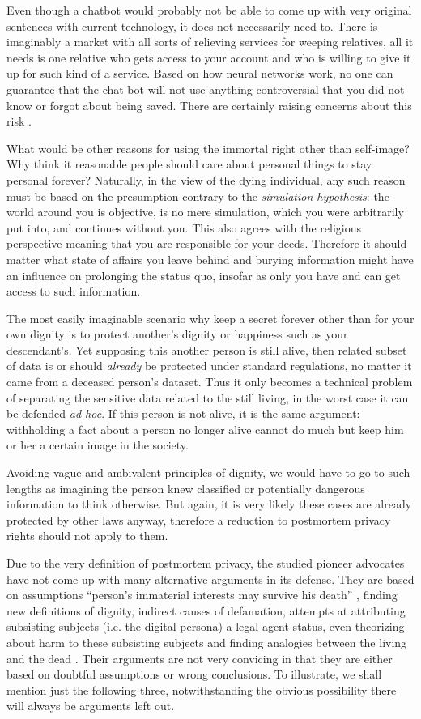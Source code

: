 \documentclass[a4paper]{article}
\begin{document}
Even though a chatbot would probably not be able to come up with very original sentences with current technology, it does not necessarily need to. 
There is imaginably a market with all sorts of relieving services for weeping relatives, all it needs is one relative who gets access to your account and who is willing to give it up for such kind of a service. 
Based on how neural networks work, no one can guarantee that the chat bot will not use anything controversial that you did not know or forgot about being saved. There are certainly raising concerns about this risk \cite{angstrom}.

What would be other reasons for using the immortal right other than self-image? Why think it reasonable people should care about personal things to stay personal forever? Naturally, in the view of the dying individual, any such reason must be based on the presumption contrary to the \textit{simulation hypothesis}: \cite{bostrom} the world around you is objective, is no mere simulation, which you were arbitrarily put into, and continues without you. This also agrees with the religious perspective meaning that you are responsible for your deeds.
Therefore it should matter what state of affairs you leave behind and burying information might have an influence on prolonging the status quo, insofar as only you have and can get access to such information.

The most easily imaginable scenario why keep a secret forever other than for your own dignity is to protect another's dignity or happiness such as your descendant's. Yet supposing this another person is still alive, then related subset of data is or should \emph{already} be protected under standard regulations, no matter it came from a deceased person's dataset. Thus it only becomes a technical problem of separating the sensitive data related to the still living, in the worst case it can be defended \emph{ad hoc}. If this person is not alive, it is the same argument: withholding a fact about a person no longer alive cannot do much but keep him or her a certain image in the society.

Avoiding vague and ambivalent principles of dignity, we would have to go to such lengths as imagining the person knew classified or potentially dangerous information to think otherwise. But again, it is very likely these cases are already protected by other laws anyway, therefore a reduction to postmortem privacy rights should not apply to them.

Due to the very definition of postmortem privacy, the studied pioneer advocates have not come up with many alternative arguments in its defense. They are based on assumptions ``person's immaterial interests may survive his death'' \cite{buitelaar}, finding new definitions of dignity, indirect causes of defamation, attempts at attributing subsisting subjects (i.e. the digital persona) a legal agent status, even theorizing about harm to these subsisting subjects and finding analogies between the living and the dead \cite{buitelaar, harbinja2}. Their arguments are not very convicing in that they are either based on doubtful assumptions or wrong conclusions. To illustrate, we shall mention just the following three, notwithstanding the obvious possibility there will always be arguments left out.
\end{document}
